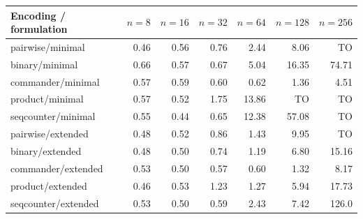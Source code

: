 \begin{tabular}{lrrrrrr}
\toprule
Encoding / formulation & $n=8$ & $n=16$ & $n=32$ & $n=64$ & $n=128$ & $n=256$ \\
\midrule
pairwise/minimal & 0.46 & 0.56 & 0.76 & 2.44 & 8.06 & TO \\
binary/minimal & 0.66 & 0.57 & 0.67 & 5.04 & 16.35 & 74.71 \\
commander/minimal & 0.57 & 0.59 & 0.60 & 0.62 & 1.36 & 4.51 \\
product/minimal & 0.57 & 0.52 & 1.75 & 13.86 & TO & TO \\
seqcounter/minimal & 0.55 & 0.44 & 0.65 & 12.38 & 57.08 & TO \\
pairwise/extended & 0.48 & 0.52 & 0.86 & 1.43 & 9.95 & TO \\
binary/extended & 0.48 & 0.50 & 0.74 & 1.19 & 6.80 & 15.16 \\
commander/extended & 0.53 & 0.50 & 0.57 & 0.60 & 1.32 & 8.17 \\
product/extended & 0.46 & 0.53 & 1.23 & 1.27 & 5.94 & 17.73 \\
seqcounter/extended & 0.53 & 0.50 & 0.59 & 2.43 & 7.42 & 126.0 \\
\bottomrule
\end{tabular}
